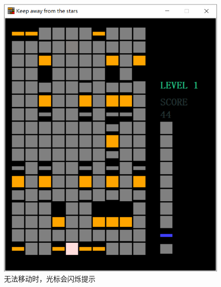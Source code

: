 \documentclass[UTF8]{article}
\begin{document}
\begin{figure}[htbp]
\centering
\begin{minipage}[t]{0.48\textwidth}
\centering
\includegraphics[scale=0.3]{fig_4.png}
\caption{无法移动时，光标会闪烁提示}
\end{minipage}
\begin{minipage}[t]{0.48\textwidth}
\centering

\end{minipage}
\end{figure}
\end{document}
